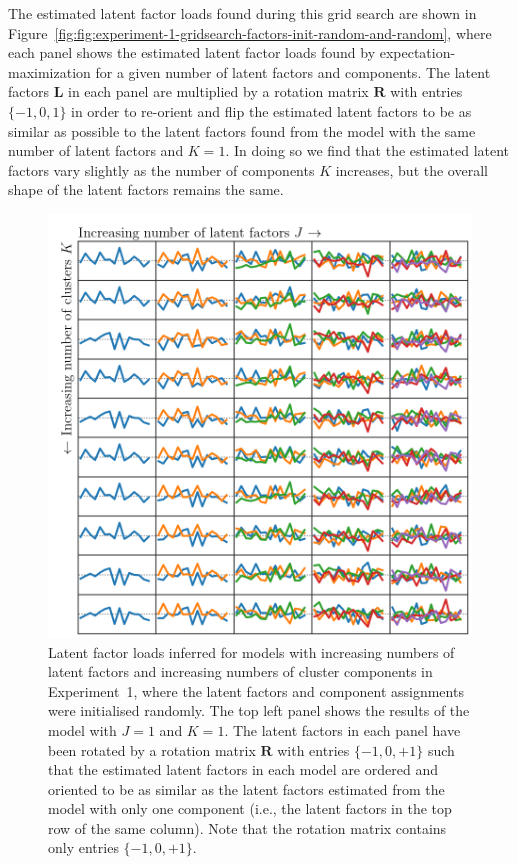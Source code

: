 \documentclass[twocolumn]{aastex61}
\newcommand{\factorloads}{\textbf{L}}
\newcommand{\NumLatentFactors}{J}
\newcommand{\NumComponents}{K}
\begin{document}
The estimated latent factor loads found during this grid search are shown in
Figure~\ref{fig:fig:experiment-1-gridsearch-factors-init-random-and-random},
where each panel shows the estimated latent factor loads found by
expectation-maximization for a given number of latent factors and components.
The latent factors $\factorloads$ in each panel are multiplied by a rotation
matrix $\mathbf{R}$ with entries $\{-1, 0, 1\}$ in order to re-orient and flip
the estimated latent factors to be as similar as possible to the latent factors
found from the model with the same number of latent factors and $\NumComponents  =  1$.
In doing so we find that the estimated latent factors vary slightly as
the number of components $\NumComponents$ increases, but the overall shape
of the latent factors remains the same.


\begin{figure}
	\includegraphics[width=1.0\textwidth]{experiments/toy-factors-init-randomly.png}
	\caption{Latent factor loads inferred for models with increasing numbers
			 of latent factors and increasing numbers of cluster components
			 in Experiment~1, where the latent factors and component assignments
			 were initialised randomly.
				The top left panel shows the results of the model with
			 $\NumLatentFactors = 1$ and $\NumComponents = 1$. 
			 The latent factors in each panel have been rotated by a
			 rotation matrix $\textbf{R}$ with entries $\{-1, 0, +1\}$ such 
			 that the estimated latent factors in each model are ordered 
			 and oriented to be as similar as the latent factors estimated from
			 the model with only one component (i.e., the latent factors in the top row
			 of the same column). Note that the rotation
			 matrix contains only entries $\{-1, 0, +1\}$.}
	\label{fig:toy-factors-init-randomly}
\end{figure}
\end{document}
